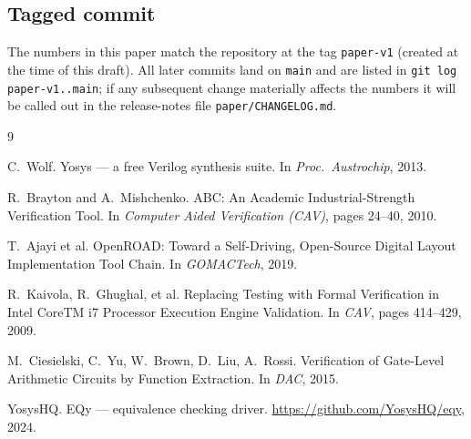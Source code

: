 \documentclass[11pt,a4paper]{article}
\begin{document}
\subsection{Tagged commit}

The numbers in this paper match the repository at the tag
\texttt{paper-v1} (created at the time of this draft).  All later
commits land on \texttt{main} and are listed in
\texttt{git log paper-v1..main}; if any subsequent change
materially affects the numbers it will be called out in the
release-notes file \texttt{paper/CHANGELOG.md}.


\begin{thebibliography}{9}

C.~Wolf.
\newblock Yosys --- a free Verilog synthesis suite.
\newblock In \emph{Proc.\ Austrochip}, 2013.

R.~Brayton and A.~Mishchenko.
\newblock ABC: An Academic Industrial-Strength Verification Tool.
\newblock In \emph{Computer Aided Verification (CAV)}, pages 24--40, 2010.

T.~Ajayi et al.
\newblock OpenROAD: Toward a Self-Driving, Open-Source Digital Layout Implementation Tool Chain.
\newblock In \emph{GOMACTech}, 2019.

R.~Kaivola, R.~Ghughal, et al.
\newblock Replacing Testing with Formal Verification in Intel CoreTM i7 Processor Execution Engine Validation.
\newblock In \emph{CAV}, pages 414--429, 2009.

M.~Ciesielski, C.~Yu, W.~Brown, D.~Liu, A.~Rossi.
\newblock Verification of Gate-Level Arithmetic Circuits by Function Extraction.
\newblock In \emph{DAC}, 2015.

YosysHQ.
\newblock EQy --- equivalence checking driver.
\newblock \url{https://github.com/YosysHQ/eqy}, 2024.

\end{thebibliography}
\end{document}
